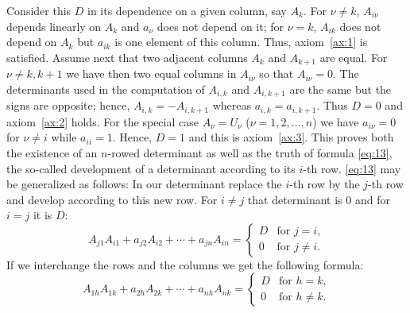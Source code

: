\documentclass[10pt,leqno,a5paper]{book}
\theoremstyle{definition}
\begin{document}
Consider this $D$ in its dependence on a given column, say $A_k$.
For $\nu \not= k$, $A_{i\nu}$ depends linearly on $A_k$ and $a_\nu$ does not depend on it; for $\nu = k$, $A_{ik}$ does not depend on $A_k$ but $a_{ik}$ is one element of this column.
Thus, axiom~\ref{ax:1} is satisfied.
Assume next that two adjacent columns $A_k$ and $A_{k+1}$ are equal.
For $\nu \not= k, k+1$ we have then two equal columns in $A_{i\nu}$ so that $A_{i\nu} = 0$.
The determinants used in the computation of $A_{i,k}$ and $A_{i,k+1}$ are the same but the signs are opposite; hence, $A_{i,k} = -A_{i,k+1}$ whereas $a_{i,k} = a_{i,k+1}$.
Thus $D = 0$ and axiom~\ref{ax:2} holds.
For the special case $A_{\nu} = U_\nu$ ($\nu = 1,2,\ldots,n$) we have $a_{i\nu} = 0$ for $\nu \not= i$ while $a_{ii} = 1$.
Hence, $D = 1$ and this is axiom~\ref{ax:3}.
This proves both the existence of an $n$-rowed determinant as well as the truth of formula \eqref{eq:13}, the so-called development of a determinant according to its $i$-th row.
\eqref{eq:13} may be generalized as follows:
In our determinant replace the $i$-th row by the $j$-th row and develop according to this new row.
For $i \not= j$ that determinant is $0$ and for $i = j$ it is $D$:
\begin{equation}
\label{eq:14}
A_{j1} A_{i1} + a_{j2} A_{i2} + \cdots + a_{jn} A_{in}
= \begin{cases}
D & \text{for $j = i$,}
\\
0 & \text{for $j \not= i$.}
\end{cases}
\end{equation}
If we interchange the rows and the columns we get the following formula:
\begin{equation}
\label{eq:15}
A_{1h} A_{1k} + a_{2h} A_{2k} + \cdots + a_{nh} A_{nk}
= \begin{cases}
D & \text{for $h = k$,}
\\
0 & \text{for $h \not= k$.}
\end{cases}
\end{equation}
\end{document}
